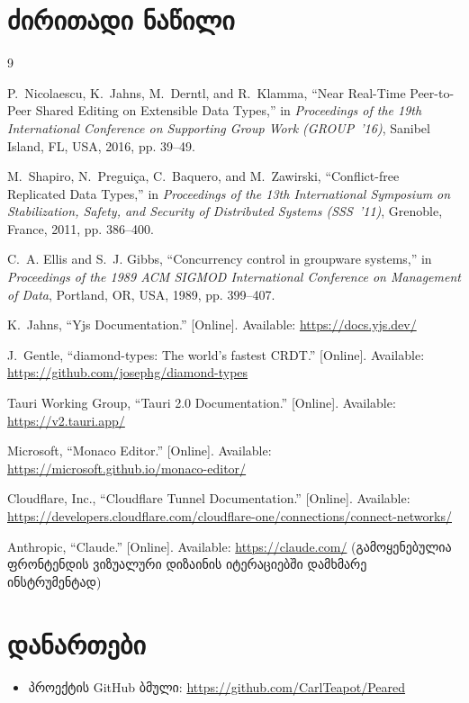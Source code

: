\documentclass[12pt,a4paper]{article}
\begin{document}


\clearpage
\section{ძირითადი ნაწილი}










\clearpage


\clearpage
{}
\begin{thebibliography}{9}

P.~Nicolaescu, K.~Jahns, M.~Derntl, and R.~Klamma,
``Near Real-Time Peer-to-Peer Shared Editing on Extensible Data Types,''
in \emph{Proceedings of the 19th International Conference on Supporting Group Work (GROUP~'16)},
Sanibel Island, FL, USA, 2016, pp. 39--49.

M.~Shapiro, N.~Preguiça, C.~Baquero, and M.~Zawirski,
``Conflict-free Replicated Data Types,''
in \emph{Proceedings of the 13th International Symposium on Stabilization, Safety, and Security of Distributed Systems (SSS~'11)},
Grenoble, France, 2011, pp. 386--400.

C.~A. Ellis and S.~J. Gibbs,
``Concurrency control in groupware systems,''
in \emph{Proceedings of the 1989 ACM SIGMOD International Conference on Management of Data},
Portland, OR, USA, 1989, pp. 399--407.

K.~Jahns, ``Yjs Documentation.'' [Online]. Available: \url{https://docs.yjs.dev/}

J.~Gentle, ``diamond-types: The world's fastest CRDT.'' [Online]. Available: \url{https://github.com/josephg/diamond-types}

Tauri Working Group, ``Tauri 2.0 Documentation.'' [Online]. Available: \url{https://v2.tauri.app/}

Microsoft, ``Monaco Editor.'' [Online]. Available: \url{https://microsoft.github.io/monaco-editor/}

Cloudflare, Inc., ``Cloudflare Tunnel Documentation.'' [Online]. Available: \url{https://developers.cloudflare.com/cloudflare-one/connections/connect-networks/}

Anthropic, ``Claude.'' [Online]. Available: \url{https://claude.com/}
(გამოყენებულია ფრონტენდის ვიზუალური დიზაინის იტერაციებში დამხმარე ინსტრუმენტად)

\end{thebibliography}

\clearpage
\section{დანართები}
\begin{itemize}
  \item პროექტის GitHub ბმული: \url{https://github.com/CarlTeapot/Peared}
\end{itemize}
\end{document}
